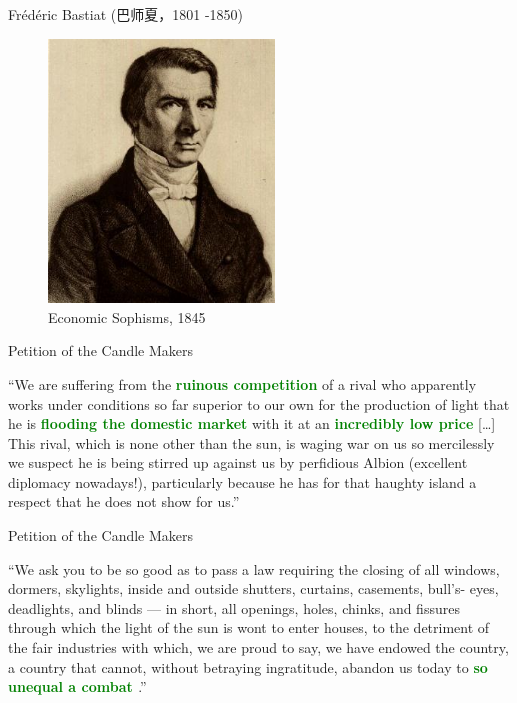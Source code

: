 \documentclass[10pt,hyperref={CJKbookmarks=true},xcolor=dvipsnames,aspectratio=169]{beamer}
\begin{document}
\begin{frame}{Frédéric Bastiat (巴师夏，1801 -1850) }


\begin{figure}


\begin{centering}
\includegraphics[width=6cm]{fig/ricardo/lec3-15}\protect\caption{Economic Sophisms, 1845 }

\par\end{centering}

\end{figure}

\end{frame}

\begin{frame}{Petition of the Candle Makers}


“We are suffering from the \textbf{\textcolor{green}{ruinous competition}}
of a rival who apparently works under conditions so far superior to
our own for the production of light that he is \textbf{\textcolor{green}{flooding
the domestic market}} with it at an \textbf{\textcolor{green}{incredibly
low price}} {[}…{]} This rival, which is none other than the sun,
is waging war on us so mercilessly we suspect he is being stirred
up against us by perfidious Albion (excellent diplomacy nowadays!),
particularly because he has for that haughty island a respect that
he does not show for us.” 


\end{frame}

\begin{frame}{Petition of the Candle Makers}


“We ask you to be so good as to pass a law requiring the closing of
all windows, dormers, skylights, inside and outside shutters, curtains,
casements, bull's- eyes, deadlights, and blinds — in short, all openings,
holes, chinks, and fissures through which the light of the sun is
wont to enter houses, to the detriment of the fair industries with
which, we are proud to say, we have endowed the country, a country
that cannot, without betraying ingratitude, abandon us today to \textbf{\textcolor{green}{so
unequal a combat }}.” 
\end{frame}
\end{document}
